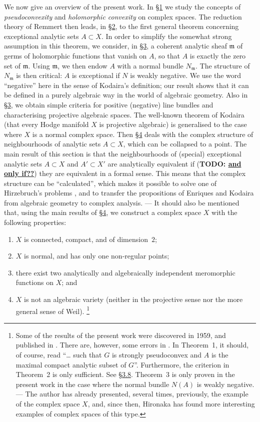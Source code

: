 \documentclass{article}
\theoremstyle{plain}
\newcommand{\fk}{\mathfrak}
\newcommand{\unsure}[1]{\textbf{TODO: \underline{#1}}}
\newcommand{\oldpage}[1]{\marginpar{\footnotesize$\Big\vert$ \textit{p.~#1}}}
\begin{document}
\oldpage{332}
We now give an overview of the present work.
In \hyperref[1]{\S1} we study the concepts of \emph{pseudoconvexity} and \emph{holomorphic convexity} on complex spaces.
The reduction theory of Remmert then leads, in \hyperref[2]{\S2}, to the first general theorem concerning exceptional analytic sets $A\subset X$.
In order to simplify the somewhat strong assumption in this theorem, we consider, in \hyperref[3]{\S3}, a coherent analytic sheaf $\fk{m}$ of germs of holomorphic functions that vanish on $A$, so that $A$ is exactly the zero set of $\fk{m}$.
Using $\fk{m}$, we then endow $A$ with a normal bundle $N_\fk{m}$.
The structure of $N_\fk{m}$ is then critical: $A$ is exceptional if $N$ is weakly negative.
We use the word ``negative'' here in the sense of Kodaira's definition; our result shows that it can be defined in a purely algebraic way in the world of algebraic geometry.
Also in \hyperref[3]{\S3}, we obtain simple criteria for positive (negative) line bundles and characterising projective algebraic spaces.
The well-known theorem of Kodaira (that every Hodge manifold $X$ is projective algebraic) is generalised to the case where $X$ is a normal complex space.
Then \hyperref[4]{\S4} deals with the complex structure of neighbourhoods of analytic sets $A\subset X$, which can be collapsed to a point.
The main result of this section is that the neighbourhoods of (special) exceptional analytic sets $A\subset X$ and $A'\subset X'$ are analytically equivalent if (\unsure{and only if??}) they are equivalent in a formal sense.
This means that the complex structure can be ``calculated'', which makes it possible to solve one of Hirzebruch's problems \cite{11}, and to transfer the propositions of Enriques and Kodaira from algebraic geometry to complex analysis.
--- It should also be mentioned that, using the main results of \hyperref[4]{\S4}, we construct a complex space $X$ with the following properties:
\begin{enumerate}[1)]
  \item $X$ is connected, compact, and of dimension~$2$;
  \item $X$ is normal, and has only one non-regular points;
  \item there exist two analytically and algebraically independent meromorphic functions on $X$; and
  \item $X$ is not an algebraic variety (neither in the projective sense nor the more general sense of Weil).%
  \footnote{
    Some of the results of the present work were discovered in 1959, and published in \cite{7}.
    There are, however, some errors in \cite{7}.
    In Theorem~1, it should, of course, read ``\ldots{} such that $G$ is strongly pseudoconvex and $A$ is the maximal compact analytic subset of $G$''.
    Furthermore, the criterion in Theorem~2 is only sufficient.
    See \hyperref[3.8]{\S3.8}.
    Theorem~3 is only proven in the present work in the case where the normal bundle $N(A)$ is weakly negative.
    --- The author has already presented, several times, previously, the example of the complex space $X$, and, since then, Hironaka has found more interesting examples of complex spaces of this type.
  }
\end{enumerate}
\end{document}
